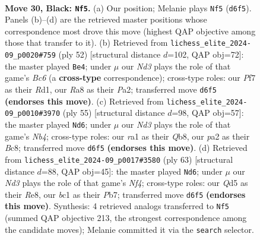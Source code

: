 \documentclass[11pt]{article}
\begin{document}
\begin{figure}[p]
\label{fig:thought-m57}
\end{figure}

\clearpage

\begin{figure}[p]\centering
\begin{subfigure}{0.46\textwidth}\centering
\resizebox{\linewidth}{!}{%
\newchessgame
\chessboard[
  setfen={r1b5/ppp2ppk/3n1b1p/3q4/B4Q2/5P1P/PP4PK/R1B5 b - - 1 30},
  showmover=false,
  pgfstyle=straightmove, color=movearrow, markmove={d6-f5}
]}
\caption{}
\end{subfigure}\hfill
\begin{subfigure}{0.46\textwidth}\centering
\resizebox{\linewidth}{!}{%
\newchessgame
\chessboard[
  setfen={2r3k1/p4pb1/bnB2qpp/8/3p1B2/1P1N1QP1/P4P1P/3R2K1 w - - 8 27},
  showmover=false,
  pgfstyle=straightmove, color=movearrow, markmove={c6-e4}
]}
\caption{}
\end{subfigure}
\\[4pt]
\begin{subfigure}{0.46\textwidth}\centering
\resizebox{\linewidth}{!}{%
\newchessgame
\chessboard[
  setfen={1qb1r3/pp2ppkp/6p1/1nNP4/1P6/P2Q2PP/5PB1/4R1K1 b - - 8 28},
  showmover=false,
  pgfstyle=straightmove, color=movearrow, markmove={b5-d6}
]}
\caption{}
\end{subfigure}\hfill
\begin{subfigure}{0.46\textwidth}\centering
\resizebox{\linewidth}{!}{%
\newchessgame
\chessboard[
  setfen={4r1k1/1p3pp1/p5qp/Bb3n2/8/1P1pPQPP/P4PB1/2R3K1 b - - 0 32},
  showmover=false,
  pgfstyle=straightmove, color=movearrow, markmove={f5-d6}
]}
\caption{}
\end{subfigure}
\caption{\textbf{Move 30, Black: \texttt{Nf5}.} (a) Our position; Melanie plays \texttt{Nf5} (\texttt{d6f5}). Panels (b)--(d) are the retrieved master positions whose correspondence most drove this move (highest QAP objective among those that transfer to it). (b) Retrieved from \texttt{lichess\_elite\_2024-09\_p0020\#759} (ply 52) [structural distance $d$=102, QAP obj=72]: the master played \texttt{Be4}; under $\mu$ our \emph{Nd3} plays the role of that game's \emph{Bc6} (a \textbf{cross-type} correspondence); cross-type roles: our \emph{P}f7 as their \emph{R}d1, our \emph{R}a8 as their \emph{P}a2; transferred move \texttt{d6f5} \textbf{(endorses this move)}. (c) Retrieved from \texttt{lichess\_elite\_2024-09\_p0010\#3970} (ply 55) [structural distance $d$=98, QAP obj=57]: the master played \texttt{Nd6}; under $\mu$ our \emph{Nd3} plays the role of that game's \emph{Nb4}; cross-type roles: our \emph{r}a1 as their \emph{Q}b8, our \emph{p}a2 as their \emph{B}c8; transferred move \texttt{d6f5} \textbf{(endorses this move)}. (d) Retrieved from \texttt{lichess\_elite\_2024-09\_p0017\#3580} (ply 63) [structural distance $d$=88, QAP obj=45]: the master played \texttt{Nd6}; under $\mu$ our \emph{Nd3} plays the role of that game's \emph{Nf4}; cross-type roles: our \emph{Q}d5 as their \emph{R}e8, our \emph{b}c1 as their \emph{P}b7; transferred move \texttt{d6f5} \textbf{(endorses this move)}. Synthesis: 4 retrieved analogs transferred to \texttt{Nf5} (summed QAP objective 213, the strongest correspondence among the candidate moves); Melanie committed it via the \texttt{search} selector.}

\end{figure}
\end{document}
